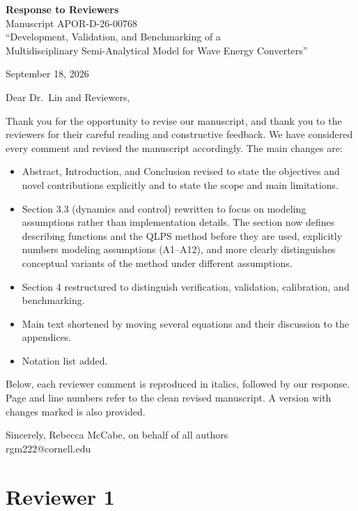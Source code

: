\documentclass[11pt]{article}
\begin{document}
\begin{center}
\textbf{\large Response to Reviewers}\\[4pt]
Manuscript APOR-D-26-00768\\
``Development, Validation, and Benchmarking of a \\
Multidisciplinary Semi-Analytical Model for Wave Energy Converters''
\end{center}

September 18, 2026

Dear Dr.\ Lin and Reviewers,

Thank you for the opportunity to revise our manuscript, and thank you to the reviewers for their careful reading and constructive feedback. We have considered every comment and revised the manuscript accordingly. The main changes are:

\begin{itemize}
  \item Abstract, Introduction, and Conclusion revised to state the objectives and novel contributions explicitly and to state the scope and main limitations.
  \item Section 3.3 (dynamics and control) rewritten to focus on modeling assumptions rather than implementation details.
  The section now defines describing functions and the QLPS method before they are used, explicitly numbers modeling assumptions (A1--A12),
  and more clearly distinguishes conceptual variants of the method under different assumptions.
  \item Section 4 restructured to distinguish verification, validation, calibration, and benchmarking.
  \item Main text shortened by moving several equations and their discussion to the appendices.
  \item Notation list added.
\end{itemize}

Below, each reviewer comment is reproduced in italics, followed by our response. Page and line numbers refer to the clean revised manuscript. A version with changes marked is also provided.

Sincerely,
Rebecca McCabe, on behalf of all authors\\
rgm222@cornell.edu


\clearpage

\section*{Reviewer 1}
\end{document}
